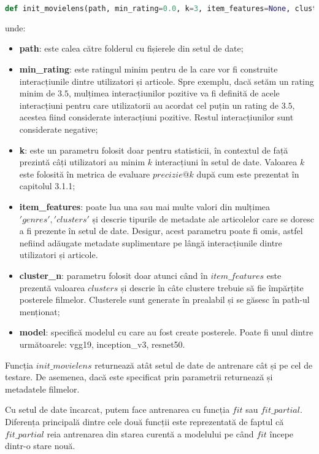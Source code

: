 \begin{lstlisting}[language=Python, caption=Funcția de inițializare a bazei de date]
def init_movielens(path, min_rating=0.0, k=3, item_features=None, cluster_n=18, model='vgg19')
\end{lstlisting}
unde:
\begin{itemize}
	\item \textbf{path}: este calea către folderul cu fișierele din setul de date;
	\item \textbf{min\_rating}: este ratingul minim pentru de la care vor fi construite interacțiunile dintre utilizatori și articole. Spre exemplu, dacă setăm un rating minim de $3.5$, mulțimea interacțiunilor pozitive va fi definită de acele interacțiuni pentru care utilizatorii au acordat cel puțin un rating de $3.5$, acestea fiind considerate interacțiuni pozitive. Restul interacțiunilor sunt considerate negative;
	\item \textbf{k}: este un parametru folosit doar pentru statisticii, în contextul de față prezintă câți utilizatori au minim $k$ interacțiuni în setul de date. Valoarea $k$ este folosită în metrica de evaluare $precizie@k$ după cum este prezentat în capitolul 3.1.1; 
	\item \textbf{item\_features}: poate lua una sau mai multe valori din mulțimea ${'genres', 'clusters'}$ și descrie tipurile de metadate ale articolelor care se doresc a fi prezente în setul de date. Desigur, acest parametru poate fi omis, astfel nefiind adăugate metadate suplimentare pe lângă interacțiunile dintre utilizatori și articole.
	\item \textbf{cluster\_n}: parametru folosit doar atunci când în $item\_features$ este prezentă valoarea $clusters$ și descrie în câte clustere trebuie să fie împărțite posterele filmelor. Clusterele sunt generate în prealabil și se găsesc în path-ul menționat;
	\item \textbf{model}: specifică modelul cu care au fost create posterele. Poate fi unul dintre următoarele: vgg19, inception\_v3, resnet50.
\end{itemize}
Funcția $init\_movielens$ returnează atât setul de date de antrenare cât și pe cel de testare. De asemenea, dacă este specificat prin parametrii returnează și metadatele filmelor.

Cu setul de date încarcat, putem face antrenarea cu funcția $fit$ sau $fit\_partial$. Diferența principală dintre cele două funcții este reprezentată de faptul că $fit\_partial$ reia antrenarea din starea curentă a modelului pe când $fit$ începe dintr-o stare nouă. 

